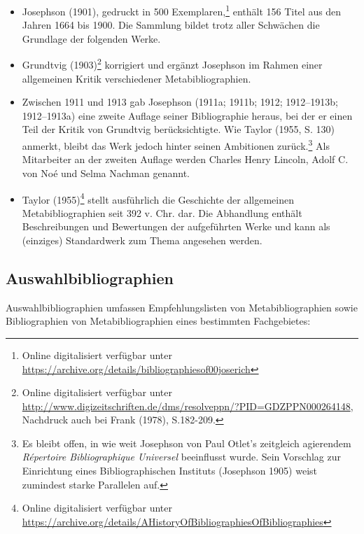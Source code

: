 \documentclass[a4paper,
fontsize=11pt,
oneside,
numbers=noperiodatend,
parskip=half-,
bibliography=totoc,
final
]{scrartcl}
\begin{document}
\begin{itemize}
\item
  Josephson (1901), gedruckt in 500 Exemplaren,\footnote{Online
    digitalisiert verfügbar unter
    \url{https://archive.org/details/bibliographiesof00joserich}}
  enthält 156 Titel aus den Jahren 1664 bis 1900. Die Sammlung bildet
  trotz aller Schwächen die Grundlage der folgenden Werke.
\item
  Grundtvig (1903)\footnote{Online digitalisiert verfügbar unter
    \url{http://www.digizeitschriften.de/dms/resolveppn/?PID=GDZPPN000264148},
    Nachdruck auch bei Frank (1978), S.182-209.} korrigiert und ergänzt
  Josephson im Rahmen einer allgemeinen Kritik verschiedener
  Metabibliographien.
\item
  Zwischen 1911 und 1913 gab Josephson (1911a; 1911b; 1912; 1912--1913b;
  1912--1913a) eine zweite Auflage seiner Bibliographie heraus, bei der
  er einen Teil der Kritik von Grundtvig berücksichtigte. Wie Taylor
  (1955, S. 130) anmerkt, bleibt das Werk jedoch hinter seinen
  Ambitionen zurück.\footnote{Es bleibt offen, in wie weit Josephson von
    Paul Otlet's zeitgleich agierendem \emph{Répertoire Bibliographique
    Universel} beeinflusst wurde. Sein Vorschlag zur Einrichtung eines
    Bibliographischen Instituts (Josephson 1905) weist zumindest starke
    Parallelen auf.} Als Mitarbeiter an der zweiten Auflage werden
  Charles Henry Lincoln, Adolf C. von Noé und Selma Nachman genannt.
\item
  Taylor (1955)\footnote{Online digitalisiert verfügbar unter
    \url{https://archive.org/details/AHistoryOfBibliographiesOfBibliographies}}
  stellt ausführlich die Geschichte der allgemeinen Metabibliographien
  seit 392 v. Chr. dar. Die Abhandlung enthält Beschreibungen und
  Bewertungen der aufgeführten Werke und kann als (einziges)
  Standardwerk zum Thema angesehen werden.
\end{itemize}

\subsection*{Auswahlbibliographien}\label{auswahlbibliographien}

Auswahlbibliographien umfassen Empfehlungslisten von Metabibliographien
sowie Bibliographien von Metabibliographien eines bestimmten
Fachgebietes:
\end{document}
